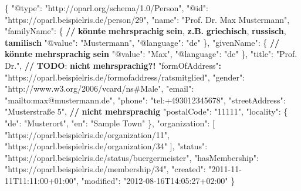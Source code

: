 \documentclass[,a4paper]{article}
\newenvironment{Shaded}{}{}
\newcommand{\DataTypeTok}[1]{\textcolor[rgb]{0.56,0.13,0.00}{{#1}}}
\newcommand{\StringTok}[1]{\textcolor[rgb]{0.25,0.44,0.63}{{#1}}}
\newcommand{\ErrorTok}[1]{\textcolor[rgb]{1.00,0.00,0.00}{\textbf{{#1}}}}
\newcommand{\NormalTok}[1]{{#1}}
\begin{document}
\begin{Shaded}
\begin{Highlighting}[]
\NormalTok{\{}
    \DataTypeTok{"@type"}\NormalTok{: }\StringTok{"http://oparl.org/schema/1.0/Person"}\NormalTok{,}
    \DataTypeTok{"@id"}\NormalTok{: }\StringTok{"https://oparl.beispielris.de/person/29"}\NormalTok{,}
    \DataTypeTok{"name"}\NormalTok{: }\StringTok{"Prof. Dr. Max Mustermann"}\NormalTok{,}
    \DataTypeTok{"familyName"}\NormalTok{: \{ }\ErrorTok{//} \ErrorTok{könnte} \ErrorTok{mehrsprachig} \ErrorTok{sein}\NormalTok{, }\ErrorTok{z.B.} \ErrorTok{griechisch}\NormalTok{, }\ErrorTok{russisch}\NormalTok{, }\ErrorTok{tamilisch} 
        \DataTypeTok{"@value"}\NormalTok{: }\StringTok{"Mustermann"}\NormalTok{,}
        \DataTypeTok{"@language"}\NormalTok{: }\StringTok{"de"}
    \NormalTok{\},}
    \DataTypeTok{"givenName"}\NormalTok{: \{ }\ErrorTok{//} \ErrorTok{könnte} \ErrorTok{mehrsprachig} \ErrorTok{sein}
        \DataTypeTok{"@value"}\NormalTok{: }\StringTok{"Max"}\NormalTok{,}
        \DataTypeTok{"@language"}\NormalTok{: }\StringTok{"de"}
    \NormalTok{\},}
    \DataTypeTok{"title"}\NormalTok{: }\StringTok{"Prof. Dr."}\NormalTok{, }\ErrorTok{//} \ErrorTok{TODO}\NormalTok{: }\ErrorTok{nicht} \ErrorTok{mehrsprachig?!}
    \StringTok{"formOfAddress"}\ErrorTok{:} \StringTok{"https://oparl.beispielris.de/formofaddress/ratsmitglied"}\NormalTok{,}
    \DataTypeTok{"gender"}\NormalTok{: }\StringTok{"http://www.w3.org/2006/vcard/ns#Male"}\NormalTok{,}
    \DataTypeTok{"email"}\NormalTok{: }\StringTok{"mailto:max@mustermann.de"}\NormalTok{,}
    \DataTypeTok{"phone"}\NormalTok{: }\StringTok{"tel:+493012345678"}\NormalTok{,}
    \DataTypeTok{"streetAddress"}\NormalTok{: }\StringTok{"Musterstraße 5"}\NormalTok{, }\ErrorTok{//} \ErrorTok{nicht} \ErrorTok{mehrsprachig}
    \DataTypeTok{"postalCode"}\NormalTok{: }\StringTok{"11111"}\NormalTok{,}
    \DataTypeTok{"locality"}\NormalTok{: \{}
        \DataTypeTok{"de"}\NormalTok{: }\StringTok{"Musterort"}\NormalTok{,}
        \DataTypeTok{"en"}\NormalTok{: }\StringTok{"Sample Town"}
    \NormalTok{\},}
    \DataTypeTok{"organization"}\NormalTok{: [}
        \StringTok{"https://oparl.beispielris.de/organization/11"}\NormalTok{,}
        \StringTok{"https://oparl.beispielris.de/organization/34"}
    \NormalTok{],}
    \DataTypeTok{"status"}\NormalTok{: }\StringTok{"https://oparl.beispielris.de/status/buergermeister"}\NormalTok{,}
    \DataTypeTok{"hasMembership"}\NormalTok{: }\StringTok{"https://oparl.beispielris.de/membership/34"}\NormalTok{,}
    \DataTypeTok{"created"}\NormalTok{: }\StringTok{"2011-11-11T11:11:00+01:00"}\NormalTok{,}
    \DataTypeTok{"modified"}\NormalTok{: }\StringTok{"2012-08-16T14:05:27+02:00"}
\NormalTok{\}}
\end{Highlighting}
\end{Shaded}
\end{document}
